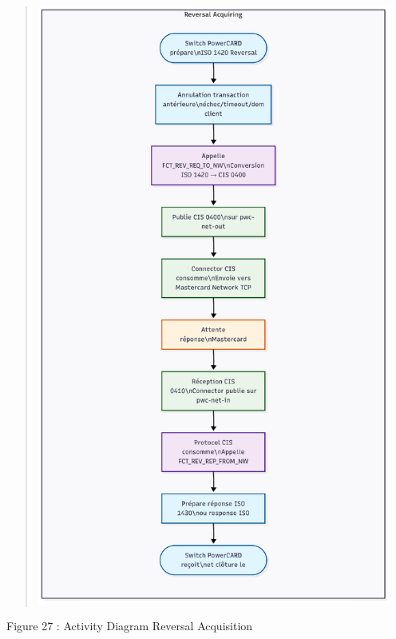 \documentclass[12pt,a4paper]{report}
\begin{document}
\begin{quote}
\includegraphics[width=4.59106in,height=7.78699in]{vertopal_d1b0b2209edd4c6aa8254f57daa0953b/media/image46.png}
\end{quote}

\protect\hypertarget{_Toc201954503}{}{}Figure 27 : Activity Diagram
Reversal Acquisition
\end{document}
